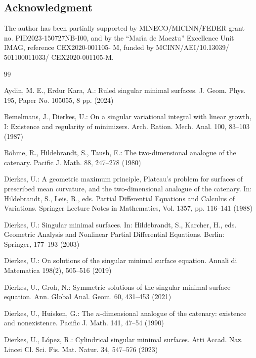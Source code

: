 \documentclass{birkjour}
\theoremstyle{definition}
\theoremstyle{remark}
\numberwithin{equation}{section}
\begin{document}
\subsection*{Acknowledgment}
The author  has been partially supported by MINECO/MICINN/FEDER grant no. PID2023-150727NB-I00,  and by the ``Mar\'{\i}a de Maeztu'' Excellence Unit IMAG, reference CEX2020-001105- M, funded by MCINN/AEI/10.13039/ 501100011033/ CEX2020-001105-M.
\begin{thebibliography}{99}
  
     Aydin,  M. E.,   Erdur Kara, A.:  Ruled singular minimal surfaces. J. Geom. Phys. 195, Paper No. 105055, 8 pp. (2024)

  Bemelmans, J., Dierkes, U.:  On a singular variational integral with linear growth, I: Existence and regularity of minimizers.   Arch. Ration. Mech. Anal.    100,  83--103  (1987) 


 
   B\"{o}hme, R.,  Hildebrandt, S.,  Taush, E.:
The two-dimensional analogue of the catenary.
 Pacific J. Math. 88, 247--278 (1980)
 

   Dierkes, U.:   A geometric maximum principle, Plateau's problem for surfaces of
prescribed mean curvature, and the two-dimensional analogue of the catenary. 
In: Hildebrandt, S.,   Leis, R., eds.  Partial Differential Equations and Calculus of Variations.  
Springer Lecture Notes in Mathematics, Vol. 1357,  pp. 116--141 (1988)

 
   Dierkes, U.:  Singular minimal surfaces. In: Hildebrandt, S., Karcher, H., eds.  Geometric Analysis and Nonlinear Partial Differential Equations.  Berlin: Springer,   177--193 (2003)

 Dierkes, U.: On solutions of the singular minimal surface equation. Annali di Matematica 198(2),
505--516 (2019)

 Dierkes, U., Groh, N.: 
Symmetric solutions of the singular minimal surface equation.  
Ann. Global Anal. Geom. 60,  431--453  (2021)

   Dierkes, U.,   Huisken, G.: The $n$-dimensional analogue of the catenary: existence and nonexistence.
 Pacific J. Math.      141, 47--54  (1990)

   Dierkes, U.,   L\'opez, R.:  Cylindrical singular minimal surfaces. Atti Accad. Naz. Lincei Cl. Sci. Fis. Mat. Natur. 34, 547--576 (2023)


\end{thebibliography}
\end{document}

